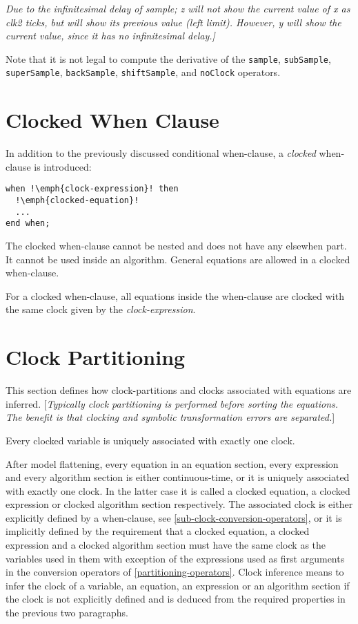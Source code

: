 \emph{Due to the infinitesimal delay of sample; z will not show the
current value of x as clk2 ticks, but will show its previous value (left
limit). However, y will show the current value, since it has no
infinitesimal delay.{]}}

Note that it is not legal to compute the derivative of the \lstinline!sample!, \lstinline!subSample!, \lstinline!superSample!, \lstinline!backSample!,
\lstinline!shiftSample!, and \lstinline!noClock! operators. 

\section{Clocked When Clause}

In addition to the previously discussed conditional when-clause, a
\emph{clocked} when-clause is introduced:
\begin{lstlisting}[language=modelica,escapechar=!]
when !\emph{clock-expression}! then
  !\emph{clocked-equation}!
  ...
end when;
\end{lstlisting}

The clocked when-clause cannot be nested and does not have any elsewhen
part. It cannot be used inside an algorithm. General equations are
allowed in a clocked when-clause.

For a clocked when-clause, all equations inside the when-clause are
clocked with the same clock given by the \emph{clock-expression}.

\section{Clock Partitioning}

This section defines how clock-partitions and clocks associated with
equations are inferred. {[}\emph{Typically clock partitioning is
performed before sorting the equations. The benefit is that clocking and
symbolic transformation errors are separated.}{]}

Every clocked variable is uniquely associated with exactly one clock.

After model flattening, every equation in an equation section, every
expression and every algorithm section is either continuous-time, or it
is uniquely associated with exactly one clock. In the latter case it is
called a clocked equation, a clocked expression or clocked algorithm
section respectively. The associated clock is either explicitly defined
by a when-clause, see \autoref{sub-clock-conversion-operators}, or it is implicitly defined by the
requirement that a clocked equation, a clocked expression and a clocked
algorithm section must have the same clock as the variables used in them
with exception of the expressions used as first arguments in the
conversion operators of \autoref{partitioning-operators}. Clock inference means to infer the
clock of a variable, an equation, an expression or an algorithm section
if the clock is not explicitly defined and is deduced from the required
properties in the previous two paragraphs.

